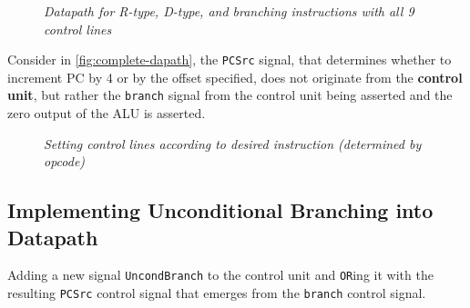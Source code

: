 \documentclass[11pt]{article}
\begin{document}
\begin{figure}[htbp]
    \centering
    \caption{\textit{Datapath for R-type, D-type, and branching instructions with all 9 control lines}}
    \label{fig:complete-dapath}
\end{figure}

Consider in \autoref{fig:complete-dapath}, the \texttt{PCSrc} signal, that determines whether to increment PC by 4 or by the offset specified, does not originate from the \textbf{control unit}, but rather the \texttt{branch} signal from the control unit being asserted and the zero output of the ALU is asserted.

\begin{figure}[htbp]
    \centering
    \caption{\textit{Setting control lines according to desired instruction (determined by opcode)}}
\end{figure}

\subsection*{Implementing Unconditional Branching into Datapath}

Adding a new signal \texttt{UncondBranch} to the control unit and \texttt{OR}ing it with the resulting \texttt{PCSrc} control signal that emerges from the \texttt{branch} control signal.
\end{document}

